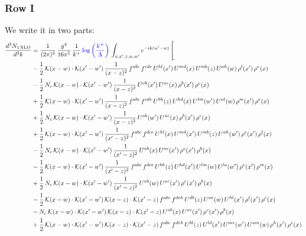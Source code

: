 \documentclass[9pt]{article}
\numberwithin{equation}{section}
\begin{document}
\subsubsection{Row I}
We write it in two parts: 
\begin{align}
\frac{d^{3}N_{1\,\mathrm{NLO}}}{d^{3}k} & = \frac{1}{(2\pi)^{3}}\,\frac{g^{4}}{16\pi^{5}}\,\frac{1}{k^{+}}\,{\color{blue}\log{\left(\frac{k^{+}}{\Lambda}\right)}}\,\int_{x,x',z,w,w'}e^{-ik(w'-w)}\,\Bigg[\notag\\ & -\frac{1}{2}\,\mathcal{K}(x-w)\cdot\mathcal{K}(x'-w')\,\frac{1}{(x-z)^{2}}\,f^{abc}\,f^{cde}\,U^{hl}(x')\,U^{md}(x)\,U^{mb}(z)\,U^{ah}(w)\,\rho^{l}(x')\,\rho^{e}(x)\notag\\
& -\frac{1}{2}\,N_{c}\,\mathcal{K}(x-w)\cdot\mathcal{K}(x'-w')\,\frac{1}{(x-z)^{2}}\,U^{ab}(x')\,U^{ac}(x)\,\rho^{b}(x')\,\rho^{c}(x)\notag\\
& +\frac{1}{2}\,\mathcal{K}(x-w)\cdot\mathcal{K}(x'-w')\,\frac{1}{(x-z)^{2}}\,f^{abc}\,f^{cde}\,U^{bh}(z)\,U^{hd}(x)\,U^{lm}(w')\,U^{al}(w)\,\rho^{m}(x')\,\rho^{e}(x)\notag\\
& +\frac{1}{2}\,N_{c}\,\mathcal{K}(x-w)\cdot\mathcal{K}(x'-w')\,\frac{1}{(x-z)^{2}}\,U^{ab}(w')\,U^{ac}(x)\,\rho^{b}(x')\,\rho^{c}(x)\notag\\
& +\frac{1}{2}\,\mathcal{K}(x-w)\cdot\mathcal{K}(x'-w')\,\frac{1}{(x'-z)^{2}}\,f^{abc}\,f^{dce}\,U^{hl}(x)\,U^{md}(x')\,U^{mb}(z)\,U^{ah}(w')\,\rho^{e}(x')\,\rho^{l}(x)\notag\\
& -\frac{1}{2}\,N_{c}\,\mathcal{K}(x-w)\cdot\mathcal{K}(x'-w')\,\frac{1}{(x'-z)^{2}}\,U^{ab}(x)\,U^{ac}(x')\,\rho^{c}(x')\,\rho^{b}(x)\notag\\
& -\frac{1}{2}\,\mathcal{K}(x-w)\cdot\mathcal{K}(x'-w')\,\frac{1}{(x'-z)^{2}}\,f^{abc}\,f^{dce}\,U^{bh}(z)\,U^{hd}(x')\,U^{lm}(w)\,U^{la}(w')\,\rho^{e}(x')\,\rho^{m}(x)\notag\\
& +\frac{1}{2}\,N_{c}\,\mathcal{K}(x-w)\cdot\mathcal{K}(x'-w')\,\frac{1}{(x'-z)^{2}}\,U^{ab}(w)\,U^{ac}(x')\,\rho^{c}(x')\,\rho^{b}(x)\notag\\
& -\frac{1}{2}\,\mathcal{K}(x-w)\cdot\mathcal{K}(x'-w')\,\mathcal{K}(x-z)\cdot\mathcal{K}(x'-z)\,f^{abc}\,f^{deh}\,U^{db}(z)\,U^{ae}(w)\,U^{hl}(x')\,\rho^{l}(x')\,\rho^{c}(x)\notag\\
& -N_{c}\,\mathcal{K}(x-w)\cdot\mathcal{K}(x'-w')\,\mathcal{K}(x-z)\cdot\mathcal{K}(x'-z)\,U^{ab}(x)\,U^{ac}(x')\,\rho^{c}(x')\,\rho^{b}(x)\notag\\
& +\frac{1}{2}\,\mathcal{K}(x-w)\cdot\mathcal{K}(x'-w')\,\mathcal{K}(x-z)\cdot\mathcal{K}(x'-z)\,f^{abc}\,f^{deh}\,U^{bl}(z)\,U^{ld}(x')\,U^{me}(w')\,U^{am}(w)\,\rho^{h}(x')\,\rho^{c}(x)\notag\\

\end{align}
\end{document}
